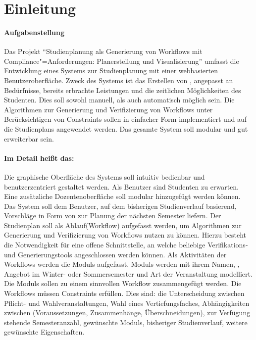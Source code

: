 \section{Einleitung}
\paragraph{Aufgabenstellung}
Das Projekt \enquote{Studienplanung als Generierung von Workflows mit Compliance"=Anforderungen: Planerstellung und Visualisierung} umfasst die Entwicklung eines Systems zur Studienplanung mit einer webbasierten Benutzeroberfläche. Zweck des Systems ist das Erstellen von , angepasst an Bedürfnisse, bereits erbrachte Leistungen und die zeitlichen Möglichkeiten des Studenten. Dies soll sowohl manuell, als auch automatisch möglich sein. Die Algorithmen zur \gls{Generierung} und \gls{Verifizierung} von Workflows unter Berücksichtigen von \glspl{Constraint} sollen in einfacher Form implementiert und auf die \glspl{Studienplan} angewendet werden. Das gesamte System soll \gls{modular} und gut erweiterbar sein.\\
\paragraph{Im Detail heißt das:}
Die graphische Oberfläche des Systems soll intuitiv bedienbar und benutzerzentriert gestaltet werden. Als \gls{Benutzer} sind Studenten zu erwarten. Eine zusätzliche Dozentenoberfläche soll \gls{modular} hinzugefügt werden können. Das System soll dem \gls{Benutzer}, auf dem bisherigen Studienverlauf basierend, Vorschläge in Form von  zur Planung der nächsten Semester liefern. Der \gls{Studienplan} soll als Ablauf(Workflow) aufgefasst werden, um Algorithmen zur \gls{Generierung} und \gls{Verifizierung} von Workflows nutzen zu können. Hierzu besteht die Notwendigkeit für eine offene Schnittstelle, an welche beliebige Verifikations- und Generierungstools angeschlossen werden können. Als Aktivitäten der Workflows werden die \glspl{Modul} aufgefasst. \glspl{Modul} werden mit ihrem Namen, , Angebot im Winter- oder Sommersemester und Art der Veranstaltung modelliert. Die \glspl{Modul} sollen zu einem sinnvollen Workflow zusammengefügt werden. Die Workflows müssen \glspl{Constraint} erfüllen. Dies sind: die Unterscheidung zwischen Pflicht- und Wahlveranstaltungen, Wahl eines Vertiefungsfaches, Abhängigkeiten zwischen  (Voraussetzungen, Zusammenhänge, Überschneidungen), zur Verfügung stehende Semesteranzahl, gewünschte \glspl{Modul}, bisheriger Studienverlauf, weitere gewünschte Eigenschaften.\\